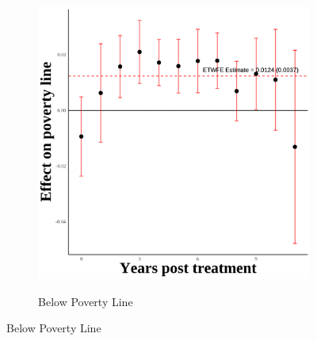 \documentclass[12pt,english]{article}
\begin{document}
\begin{figure}[H]
\begin{subfigure}[b]{0.3\textwidth}
    \label{fig:snap-secgen-wh}
  \end{subfigure}
  \hfill
  \begin{subfigure}[b]{0.3\textwidth}
    \centering
    \caption{Below Poverty Line}
    \includegraphics[width=\linewidth]{figures/plot46-poverty_line_event_study-secgen-wh.png}
    \label{fig:poverty-line-secgen-wh}
  \end{subfigure}

  \vspace{0.3cm} %


\end{figure}
\end{document}
